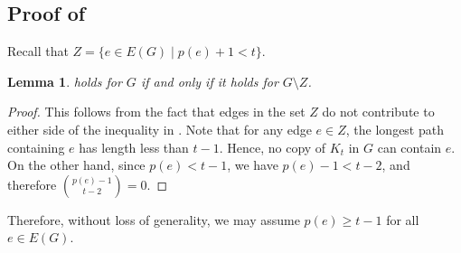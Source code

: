 \documentclass[pdflatex,sn-basic,Numbered]{sn-jnl}
\newtheorem{lemma}{Lemma}
\begin{document}
\subsection{Proof of }
 Recall that $Z= \{e \in E(G) \mid p(e) +1 < t\}$.
\begin{lemma}\label{lem3}
 holds for $G$ if and only if it holds for $G\setminus Z$.
\end{lemma}
\begin{proof}
This follows from the fact that edges in the set $Z$ do not contribute to either side of the inequality in . Note that for any edge $e \in Z$, the longest path containing $e$ has length less than $t-1$. Hence, no copy of $K_t$ in $G$ can contain $e$. On the other hand, since $p(e) < t-1$, we have $p(e)-1 < t-2$, and therefore ${p(e)-1 \choose t-2} = 0$. 
\end{proof}
Therefore, without loss of generality, we may assume $p(e)\geq t-1$ for all $e \in E(G)$.
\end{document}
